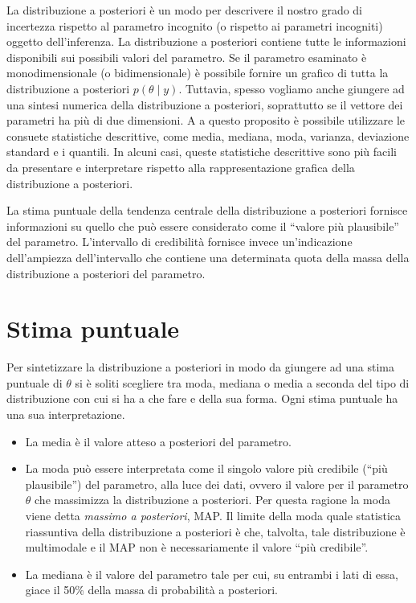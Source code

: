 \documentclass[
  11pt,
  italian,
  a4paper,
  extrafontsizes,onecolumn,openright
  ]{memoir}
\providecommand{\tightlist}{%
  \setlength{\itemsep}{0pt}\setlength{\parskip}{0pt}}
\begin{document}
La distribuzione a posteriori è un modo per descrivere il nostro grado
di incertezza rispetto al parametro incognito (o rispetto ai parametri
incogniti) oggetto dell'inferenza. La distribuzione a posteriori
contiene tutte le informazioni disponibili sui possibili valori del
parametro. Se il parametro esaminato è monodimensionale (o
bidimensionale) è possibile fornire un grafico di tutta la distribuzione a posteriori \(p(\theta \mid y)\). Tuttavia, spesso vogliamo anche giungere ad una sintesi numerica della distribuzione a posteriori, soprattutto se il vettore dei parametri ha più di due dimensioni. A a questo proposito è possibile utilizzare le consuete statistiche descrittive, come media, mediana, moda, varianza, deviazione standard e i quantili. In alcuni casi, queste statistiche descrittive sono più facili da presentare e interpretare rispetto alla rappresentazione grafica della distribuzione a posteriori.

La stima puntuale della tendenza centrale della distribuzione a posteriori fornisce informazioni su quello che può essere considerato come il ``valore più plausibile'' del parametro. L'intervallo di credibilità fornisce invece un'indicazione dell'ampiezza dell'intervallo che contiene una determinata quota della massa della distribuzione a posteriori del parametro.

\hypertarget{stima-puntuale}{%
\section{Stima puntuale}\label{stima-puntuale}}

Per sintetizzare la distribuzione a posteriori in modo da giungere ad
una stima puntuale di \(\theta\) si è soliti scegliere tra moda, mediana o media a seconda del tipo di distribuzione con cui si ha a che fare e
della sua forma. Ogni stima puntuale ha una sua interpretazione.

\begin{itemize}
\tightlist
\item
  La media è il valore atteso a posteriori del parametro.
\item
  La moda può essere interpretata come il singolo valore più credibile (``più plausibile'') del parametro, alla luce dei dati, ovvero il valore per il parametro \(\theta\) che massimizza la distribuzione a posteriori. Per questa ragione la moda viene detta \emph{massimo a posteriori}, MAP. Il limite della moda quale statistica riassuntiva della distribuzione a posteriori è che, talvolta, tale distribuzione è multimodale e il MAP non è necessariamente il valore ``più credibile''.
\item
  La mediana è il valore del parametro tale per cui, su entrambi i lati di essa, giace il 50\% della massa di probabilità a posteriori.
\end{itemize}
\end{document}
